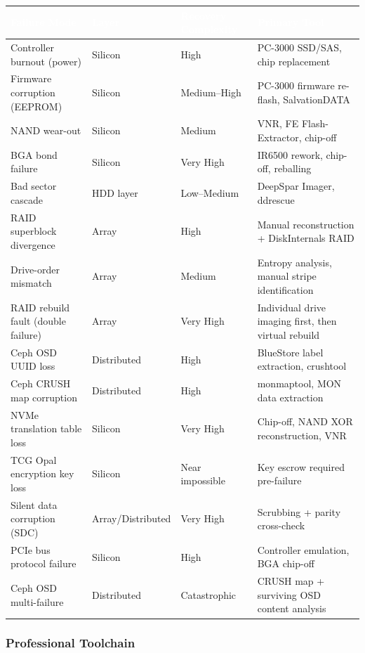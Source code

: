\documentclass[11pt,letterpaper]{article}
\newcommand{\tableheader}[1]{\textbf{\sffamily\textcolor{white}{#1}}}
\begin{document}
\begin{center}
\begin{tabularx}{\textwidth}{L{2.5cm}L{2cm}L{3cm}X}
\toprule
{}
\tableheader{Failure Mode} & \tableheader{Layer} & \tableheader{Recovery Complexity} & \tableheader{Primary Tool} \\
\midrule
Controller burnout (power) & Silicon & High & PC-3000 SSD/SAS, chip replacement \\
Firmware corruption (EEPROM) & Silicon & Medium--High & PC-3000 firmware re-flash, SalvationDATA \\
NAND wear-out & Silicon & Medium & VNR, FE Flash-Extractor, chip-off \\
BGA bond failure & Silicon & Very High & IR6500 rework, chip-off, reballing \\
Bad sector cascade & HDD layer & Low--Medium & DeepSpar Imager, ddrescue \\
RAID superblock divergence & Array & High & Manual reconstruction + DiskInternals RAID \\
Drive-order mismatch & Array & Medium & Entropy analysis, manual stripe identification \\
RAID rebuild fault (double failure) & Array & Very High & Individual drive imaging first, then virtual rebuild \\
Ceph OSD UUID loss & Distributed & High & BlueStore label extraction, crushtool \\
Ceph CRUSH map corruption & Distributed & High & monmaptool, MON data extraction \\
NVMe translation table loss & Silicon & Very High & Chip-off, NAND XOR reconstruction, VNR \\
TCG Opal encryption key loss & Silicon & Near impossible & Key escrow required pre-failure \\
Silent data corruption (SDC) & Array/Distributed & Very High & Scrubbing + parity cross-check \\
PCIe bus protocol failure & Silicon & High & Controller emulation, BGA chip-off \\
Ceph OSD multi-failure & Distributed & Catastrophic & CRUSH map + surviving OSD content analysis \\
\bottomrule
\end{tabularx}
\end{center}

\subsubsection{Professional Toolchain}
\end{document}
